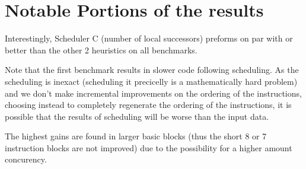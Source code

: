 \documentclass{article}
\begin{document}
\section{Notable Portions of the results}

Interestingly, Scheduler C (number of local successors) preforms on par with or better than the other 2 heuristics on all benchmarks.

Note that the first benchmark results in slower code following scheduling. As the scheduling is inexact (scheduling it precicelly is a mathematically hard problem) and we don't make incremental improvements on the ordering of the instructions, choosing instead to completely regenerate the ordering of the instructions, it is possible that the results of scheduling will be worse than the input data.

The highest gains are found in larger basic blocks (thus the short 8 or 7 instruction blocks are not improved) due to the possibility for a higher amount concurency.
\end{document}
